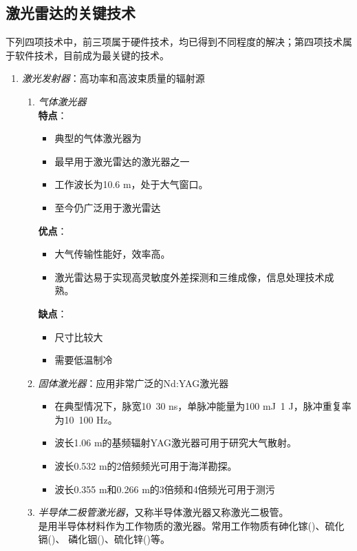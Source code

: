 \subsection{激光雷达的关键技术}
下列四项技术中，前三项属于硬件技术，均已得到不同程度的解决；第四项技术属于软件技术，目前成为最关键的技术。
\begin{enumerate}
	\item \textit{激光发射器}：高功率和高波束质量的辐射源
	\begin{enumerate}
		\item \textit{气体激光器}\\	%
		\textbf{特点}：\begin{itemize}
			\item 典型的气体激光器为
			\item 最早用于激光雷达的激光器之一
			\item 工作波长为10.6 \textmu m，处于大气窗口。
			\item 至今仍广泛用于激光雷达
		\end{itemize}
		\textbf{优点}：\begin{itemize}
			\item 大气传输性能好，效率高。
			\item {}激光雷达易于实现高灵敏度外差探测和三维成像，信息处理技术成熟。
		\end{itemize}
		\textbf{缺点}：\begin{itemize}
			\item 尺寸比较大
			\item 需要低温制冷
		\end{itemize}
		\item \textit{固体激光器}：应用非常广泛的Nd:YAG激光器 \begin{itemize}
			\item 在典型情况下，脉宽10~30 ns，单脉冲能量为100 mJ~1 J，脉冲重复率为10~100 Hz。
			\item 波长1.06 \textmu m的基频辐射YAG激光器可用于研究大气散射。
			\item 波长0.532 \textmu m的2倍频频光可用于海洋勘探。
			\item 波长0.355 \textmu m和0.266 \textmu m的3倍频和4倍频光可用于测污
		\end{itemize}
		\item \textit{半导体二极管激光器}，又称半导体激光器又称激光二极管。\\ %
		是用半导体材料作为工作物质的激光器。常用工作物质有砷化镓()、硫化镉()、 磷化铟()、硫化锌()等。\\

\end{enumerate}
\end{enumerate}
